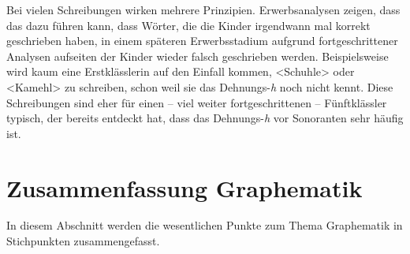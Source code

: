 Bei vielen Schreibungen wirken mehrere Prinzipien. Erwerbsanalysen zeigen, dass das dazu führen kann, dass Wörter, die die Kinder irgendwann mal korrekt geschrieben haben, in einem späteren Erwerbsstadium aufgrund fortgeschrittener Analysen aufseiten der Kinder wieder falsch geschrieben werden. Beispielsweise wird kaum eine Erstklässlerin auf den Einfall kommen, <Schuhle> oder <Kamehl> zu schreiben, schon weil sie das Dehnungs-\textit{h} noch nicht kennt. Diese Schreibungen sind eher für einen -- viel weiter fortgeschrittenen -- Fünftklässler typisch, der bereits entdeckt hat, dass das Dehnungs-\textit{h} vor Sonoranten sehr häufig ist. 

\section{Zusammenfassung Graphematik}
In diesem Abschnitt werden die wesentlichen Punkte zum Thema Graphematik in Stichpunkten zusammengefasst.

